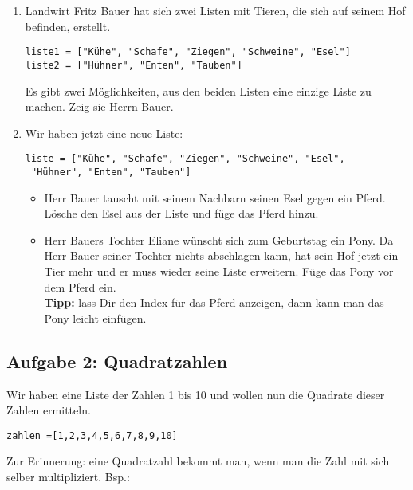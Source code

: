 \documentclass{\VorlagenPfad/coderdojokatext}
\begin{document}
\begin{enumerate}

\item
Landwirt Fritz Bauer hat sich zwei Listen mit Tieren, die sich auf seinem Hof befinden, erstellt.
\begin{verbatim}
liste1 = ["Kühe", "Schafe", "Ziegen", "Schweine", "Esel"] 
liste2 = ["Hühner", "Enten", "Tauben"]
\end{verbatim}

Es gibt zwei Möglichkeiten, aus den beiden Listen eine einzige Liste zu machen.  Zeig sie Herrn Bauer.

\item
Wir haben jetzt eine neue Liste:

\begin{verbatim}
liste = ["Kühe", "Schafe", "Ziegen", "Schweine", "Esel",
 "Hühner", "Enten", "Tauben"]
\end{verbatim}

\begin{itemize}	
\item
Herr Bauer tauscht mit seinem Nachbarn seinen Esel gegen ein Pferd. Lösche den Esel aus der Liste und füge das Pferd hinzu.
	
\item
Herr Bauers Tochter Eliane wünscht sich zum Geburtstag ein Pony. Da Herr Bauer seiner Tochter nichts abschlagen kann, hat sein Hof jetzt ein Tier mehr und er muss wieder seine Liste erweitern. 
Füge das Pony vor dem Pferd ein.
\\

\textbf{Tipp:} lass Dir den Index für das Pferd anzeigen, dann kann man das Pony leicht einfügen.

\end{itemize}
\end{enumerate}



\subsection{Aufgabe 2: Quadratzahlen}

Wir haben eine Liste der Zahlen 1 bis 10 und wollen nun die Quadrate dieser Zahlen ermitteln.

\begin{verbatim}
zahlen =[1,2,3,4,5,6,7,8,9,10]
\end{verbatim}

Zur Erinnerung: eine Quadratzahl bekommt man, wenn man die Zahl mit sich selber multipliziert. Bsp.: 
\end{document}
